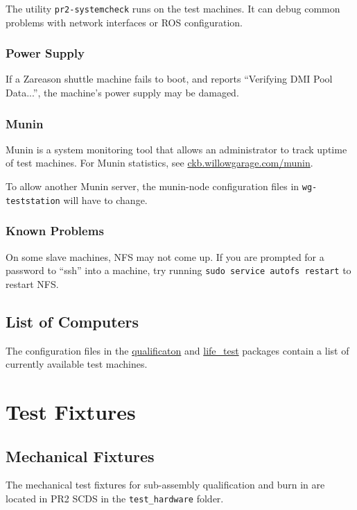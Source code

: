 \documentclass[11pt]{report}
\begin{document}
The utility \texttt{pr2-systemcheck} runs on the test machines. It can debug common problems with network interfaces or ROS configuration.

\subsection{Power Supply}

If a Zareason shuttle machine fails to boot, and reports ``Verifying DMI Pool Data...'', the machine's power supply may be damaged. 

\subsection{Munin}

Munin is a system monitoring tool that allows an administrator to track uptime of test machines. For Munin statistics, see \href{http://ckb.willowgarage.com/munin}{ckb.willowgarage.com/munin}.

To allow another Munin server, the munin-node configuration files in \texttt{wg-teststation} will have to change.

\subsection{Known Problems}

On some slave machines, NFS may not come up. If you are prompted for a password to ``ssh'' into a machine, try running \texttt{sudo service autofs restart} to restart NFS.

\section{List of Computers}

The configuration files in the \href{http://www.ros.org/wiki/qualification}{qualificaton} and \href{http://www.ros.org/wiki/life\_test}{life\_test} packages contain a list of currently available test machines. 

\chapter{Test Fixtures}

\section{Mechanical Fixtures}

The mechanical test fixtures for sub-assembly qualification and burn in are located in PR2 SCDS in the \texttt{test\_hardware} folder.
\end{document}
